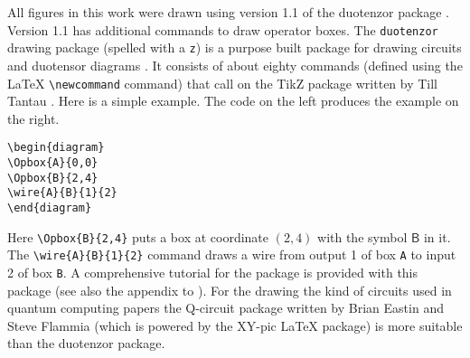 \documentclass[10pt]{article}
\begin{document}
All figures in this work were drawn using version 1.1 of the duotenzor package \cite{hardyduotenzor}. Version 1.1 has additional commands to draw operator boxes.  The \verb+duotenzor+ drawing package (spelled with a \verb+z+) is a purpose built package for drawing circuits and duotensor diagrams \cite{hardy2010formalism}.  It consists of about eighty commands (defined using the LaTeX \verb+\newcommand+ command) that call on the TikZ package written by Till Tantau \cite{tantautikz}.  Here is a simple example.  The code on the left produces the example on the right.
\begin{verbatim}
\begin{diagram}
\Opbox{A}{0,0}
\Opbox{B}{2,4}
\wire{A}{B}{1}{2}
\end{diagram}
\end{verbatim}

\vspace{-13pt}
\noindent
Here \verb+\Opbox{B}{2,4}+ puts a box at coordinate $(2,4)$ with the symbol $\mathsf B$ in it.   The \verb+\wire{A}{B}{1}{2}+ command draws a wire from output 1 of box \verb+A+ to input 2 of box \verb+B+.  A comprehensive tutorial for the package is provided with this package \cite{hardyduotenzor} (see also the appendix to \cite{hardy2010formalism}).  For the drawing the kind of circuits used in quantum computing papers the Q-circuit package written by Brian Eastin and Steve Flammia \cite{eastinqcircuit} (which is powered by the XY-pic LaTeX package) is more suitable than the duotenzor package.









\printindex
\end{document}
